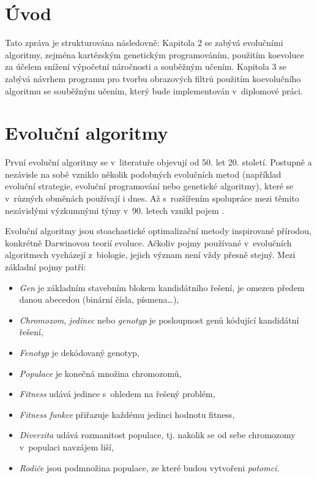 
\chapter{Úvod}

\blind


Tato zpráva je strukturována následovně: Kapitola 2 se zabývá evolučními algoritmy, zejména kartézským genetickým programováním, použitím koevoluce za účelem snížení výpočetní náročnosti a souběžným učením. Kapitola 3 se zabývá návrhem programu pro tvorbu obrazových filtrů použitím koevolučního algoritmu se souběžným učením, který bude implementován v~diplomové práci.

\chapter{Evoluční algoritmy}

První evoluční algoritmy se v~literatuře objevují od 50. let 20. století. Postupně a nezávisle na sobě vzniklo několik podobných evolučních metod (například evoluční strategie, evoluční programování nebo genetické algoritmy), které se v~různých obměnách používají i dnes. Až s~rozšířením spolupráce mezi těmito nezávislými výzkumnými týmy v~90. letech vznikl pojem .

Evoluční algoritmy jsou stoachastické optimalizační metody inspirované přírodou, konkrétně Darwinovou teorií evoluce. Ačkoliv pojmy používané v~evolučních algoritmech vycházejí z~biologie, jejich význam není vždy přesně stejný. Mezi základní pojmy patří:

\begin{itemize}
    \item\emph{Gen} je základním stavebním blokem kandidátního řešení, je omezen předem danou abecedou (binární čísla, písmena\ldots),
    \item\emph{Chromozom}, \emph{jedinec} nebo \emph{genotyp} je posloupnost genů kódující kandidátní řešení,
    \item\emph{Fenotyp} je dekódovaný genotyp,
    \item\emph{Populace} je konečná množina chromozomů,
    \item\emph{Fitness} udává  jedince s~ohledem na řešený problém,
    \item\emph{Fitness funkce} přiřazuje každému jedinci hodnotu fitness,
    \item\emph{Diverzita} udává rozmanitost populace, tj. nakolik se od sebe chromozomy v~populaci navzájem liší,
    \item\emph{Rodiče} jsou podmnožina populace, ze které budou vytvořeni \emph{potomci}.
\end{itemize}

